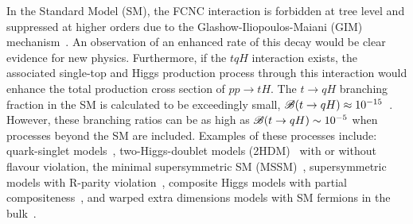 In the Standard Model (SM), the FCNC interaction is forbidden at tree level and suppressed at higher orders due to the Glashow-Iliopoulos-Maiani (GIM) mechanism~\cite{Glashow:1970gm}. An observation of an enhanced rate of this decay would be clear evidence for new physics.
Furthermore, if the $tqH$ interaction exists, the associated single-top and  Higgs  production process through this interaction would enhance
the total production cross section of $pp\rightarrow tH$.
The $t\to qH$ branching fraction in the SM is calculated to be exceedingly small, $\mathscr{B}(t\to qH)\approx10^{-15}$~\cite{Eilam:1990zc,Mele:1998ag,AguilarSaavedra:2004wm,Zhang:2013xya}. 
However, these branching ratios can be as high as $\mathscr{B}(t\to qH) \sim 10^{-5}$ when processes beyond the SM are included. Examples of these processes include: quark-singlet models~\cite{AguilarSaavedra:2002kr}, two-Higgs-doublet models (2HDM)~\cite{ Branco:2hdm2012} with or without flavour violation,
the minimal supersymmetric SM (MSSM)~\cite{Bejar:2000ub, Guasch:1999jp,Cao:2007dk,Cao:2014udj},
supersymmetric models with R-parity violation~\cite{Eilam:2001dh}, composite Higgs models with partial  compositeness~\cite{Azatov:2014lha}, 
and warped extra dimensions models with SM fermions in the bulk~\cite{Azatov:2009na}. 
